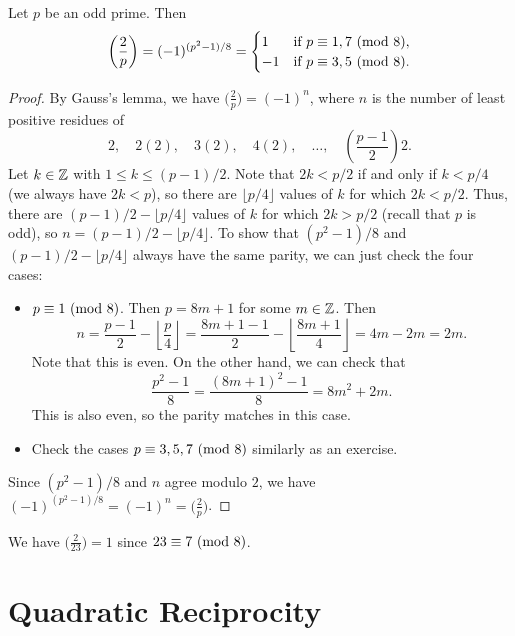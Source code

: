 \begin{theorem}
  Let $p$ be an odd prime. Then
  \[
    \left(\frac{2}{p}\right)
    = (-1)^{(p^2 - 1) / 8}
    =
    \begin{cases}
      1 & \text{if } p \equiv 1, 7 \ (\mathrm{mod}\ 8), \\
      -1 & \text{if } p \equiv 3, 5 \ (\mathrm{mod}\ 8).
    \end{cases}
  \]
\end{theorem}

\begin{proof}
  By Gauss's lemma, we have
  $\big(\frac{2}{p}\big) = (-1)^n$,
  where $n$ is the number of least positive
  residues of
  \[
    2, \quad 2(2), \quad 3(2), \quad 4(2), \quad \dots, \quad
    \left(\frac{p - 1}{2}\right) 2.
  \]
  Let $k \in \mathbb{Z}$ with $1 \le k \le (p - 1) / 2$.
  Note that $2k < p / 2$ if and only if
  $k < p / 4$ (we always have $2k < p$),
  so there are $\lfloor p / 4 \rfloor$
  values of $k$ for which $2k < p / 2$.
  Thus, there are $(p - 1) / 2 - \lfloor p / 4 \rfloor$
  values of $k$ for which
  $2k > p / 2$ (recall that $p$ is odd),
  so $n = (p - 1) / 2 - \lfloor p / 4 \rfloor$.
  To show that $(p^2 - 1) / 8$
  and $(p - 1) / 2 - \lfloor p / 4 \rfloor$
  always have the same parity, we can
  just check the four cases:
  \begin{itemize}
    \item $p \equiv 1 \ (\mathrm{mod}\ 8)$.
      Then $p = 8m + 1$ for some $m \in \mathbb{Z}$.
      Then
      \[
        n = \frac{p - 1}{2} - \left\lfloor \frac{p}{4} \right\rfloor
        = \frac{8m + 1 - 1}{2} - \left\lfloor \frac{8m + 1}{4} \right\rfloor
        = 4m - 2m = 2m.
      \]
      Note that this is even.
      On the other hand, we can check that
      \[
        \frac{p^2 - 1}{8}
        = \frac{(8m + 1)^2 - 1}{8}
        = 8m^2 + 2m.
      \]
      This is also even, so
      the parity matches in this case.
    \item Check the cases
      $p \equiv 3, 5, 7 \ (\mathrm{mod}\ 8)$ similarly
      as an exercise.
  \end{itemize}
  Since $(p^2 - 1) / 8$ and $n$ agree
  modulo $2$, we have
  $(-1)^{(p^2 - 1) / 8} = (-1)^n = \big(\frac{2}{p}\big)$.
\end{proof}

\begin{example}
  We have $\big(\frac{2}{23}\big) = 1$
  since $23 \equiv 7 \ (\mathrm{mod}\ 8)$.
\end{example}

\section{Quadratic Reciprocity}

